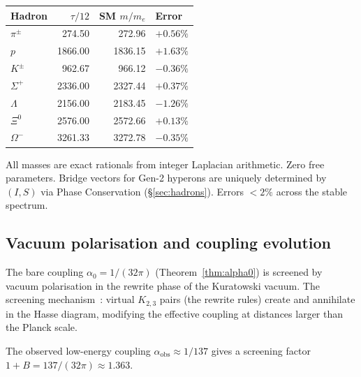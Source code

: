\documentclass[11pt]{article}
\newcommand{\Ktwo}[1]{K_{2,#1}}
\begin{document}
\begin{center}
\renewcommand{\arraystretch}{1.3}
\begin{tabular}{lrrl}
\toprule
Hadron & $\tau/12$ & SM $m/m_e$ & Error \\
\midrule
$\pi^\pm$ & 274.50 & 272.96 & $+0.56\%$ \\
$p$ & 1866.00 & 1836.15 & $+1.63\%$ \\
$K^\pm$ & 962.67 & 966.12 & $-0.36\%$ \\
$\Sigma^+$ & 2336.00 & 2327.44 & $+0.37\%$ \\
$\Lambda$ & 2156.00 & 2183.45 & $-1.26\%$ \\
$\Xi^0$ & 2576.00 & 2572.66 & $+0.13\%$ \\
$\Omega^-$ & 3261.33 & 3272.78 & $-0.35\%$ \\
\bottomrule
\end{tabular}
\end{center}

All masses are exact rationals from integer Laplacian
arithmetic.  Zero free parameters.  Bridge vectors for
Gen-2 hyperons are uniquely determined by $(I, S)$ via
Phase Conservation (\S\ref{sec:hadrons}).  Errors $< 2\%$
across the stable spectrum.

\subsection{Vacuum polarisation and coupling evolution}
\label{sec:vac-pol}

The bare coupling $\alpha_0 = 1/(32\pi)$
(Theorem~\ref{thm:alpha0}) is screened by vacuum
polarisation in the rewrite phase of the Kuratowski vacuum.
The screening mechanism~\cite{SilvaAlvarado26}: virtual
$\Ktwo{3}$ pairs (the rewrite rules) create and annihilate
in the Hasse diagram, modifying the effective coupling at
distances larger than the Planck scale.

The observed low-energy coupling $\alpha_{\mathrm{obs}}
\approx 1/137$ gives a screening factor
$1 + B = 137/(32\pi) \approx 1.363$.
\end{document}
